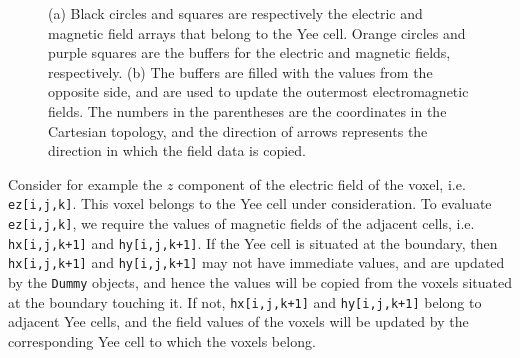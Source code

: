\begin{figure}[hp!]
  \begin{center}
  \end{center}
  \caption{(a) Black circles and squares are respectively the electric and magnetic field arrays that belong to the Yee cell. Orange circles and purple squares are the buffers for the electric and magnetic fields, respectively. (b) The buffers are filled with the values from the opposite side, and are used to update the outermost electromagnetic fields. The numbers in the parentheses are the coordinates in the Cartesian topology, and the direction of arrows represents the direction in which the field data is copied.}
  \label{fig:yee_cell_and_topology}
\end{figure}

Consider for example the $z$ component of the electric field of the voxel, i.e. \texttt{ez[i,j,k]}. This voxel belongs to the Yee cell under consideration. To evaluate \texttt{ez[i,j,k]}, we require the values of magnetic fields of the adjacent cells, i.e. \texttt{hx[i,j,k+1]} and \texttt{hy[i,j,k+1]}. If the Yee cell is situated at the boundary, then \texttt{hx[i,j,k+1]} and \texttt{hy[i,j,k+1]} may not have immediate values, and are updated by the \texttt{Dummy} objects, and hence the values will be copied from the voxels situated at the boundary touching it. If not, \texttt{hx[i,j,k+1]} and \texttt{hy[i,j,k+1]} belong to adjacent Yee cells, and the field values of the voxels will be updated by the corresponding Yee cell to which the voxels belong.

